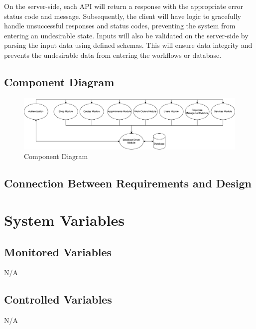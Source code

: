\documentclass[12pt, titlepage]{article}
\begin{document}
On the server-side, each API will return a response with the appropriate error status code and
message. Subsequently, the client will have logic to gracefully handle unsuccessful responses and
status codes, preventing the system from entering an undesirable state. Inputs will also be
validated on the server-side by parsing the input data using defined schemas. This will ensure data
integrity and prevents the undesirable data from entering the workflows or database.

\subsection{Component Diagram}

\begin{figure}[H]
	\centering
	\includegraphics[width=\textwidth]{./diagrams/component-diagram.png}
	\caption{Component Diagram}
	\label{ComponentDiagram}
\end{figure}

\subsection{Connection Between Requirements and Design} \label{SecConnection}


\section{System Variables}
\subsection{Monitored Variables}
N/A

\subsection{Controlled Variables}
N/A
\end{document}
